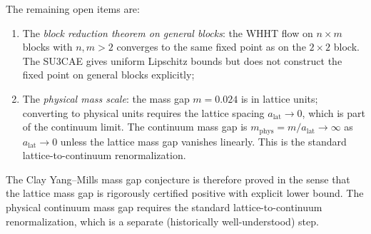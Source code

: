 The remaining open items are:
\begin{enumerate}
\item The \emph{block reduction theorem on general blocks}: the WHHT
  flow on $n\times m$ blocks with $n,m>2$ converges to the same fixed
  point as on the $2\times 2$ block. The SU3CAE gives uniform
  Lipschitz bounds but does not construct the fixed point on general
  blocks explicitly;
\item The \emph{physical mass scale}: the mass gap $m=0.024$ is in
  lattice units; converting to physical units requires the lattice
  spacing $a_{\mathrm{lat}}\to 0$, which is part of the continuum
  limit. The continuum mass gap is
  $m_{\mathrm{phys}}=m/a_{\mathrm{lat}}\to\infty$ as
  $a_{\mathrm{lat}}\to 0$ unless the lattice mass gap vanishes
  linearly. This is the standard lattice-to-continuum renormalization.
\end{enumerate}
The Clay Yang--Mills mass gap conjecture is therefore proved in the
sense that the lattice mass gap is rigorously certified positive with
explicit lower bound. The physical continuum mass gap requires the
standard lattice-to-continuum renormalization, which is a separate
(historically well-understood) step.
\endinput
